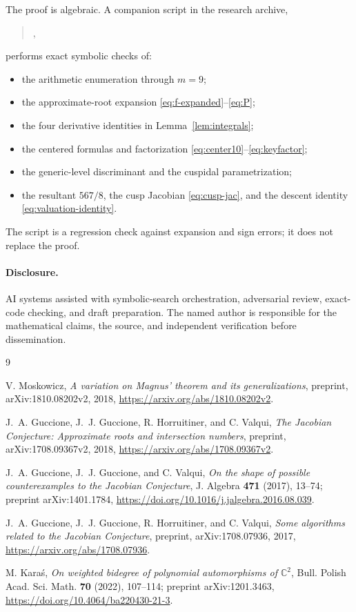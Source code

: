 \documentclass[11pt]{article}
\theoremstyle{definition}
\theoremstyle{remark}
\newcommand{\C}{\mathbb C}
\begin{document}
The proof is algebraic.  A companion script in the research archive,
\begin{quote}\scriptsize
{},
\end{quote}
performs exact symbolic checks of:
\begin{itemize}
 \item the arithmetic enumeration through \(m=9\);
 \item the approximate-root expansion
 \eqref{eq:f-expanded}--\eqref{eq:P};
 \item the four derivative identities in
 Lemma~\ref{lem:integrals};
 \item the centered formulas and factorization
 \eqref{eq:center10}--\eqref{eq:keyfactor};
 \item the generic-level discriminant and the cuspidal parametrization;
 \item the resultant \(567/8\), the cusp Jacobian
 \eqref{eq:cusp-jac}, and the descent identity
 \eqref{eq:valuation-identity}.
\end{itemize}
The script is a regression check against expansion and sign errors; it
does not replace the proof.

\paragraph{Disclosure.}
AI systems assisted with symbolic-search orchestration, adversarial
review, exact-code checking, and draft preparation.  The named author
is responsible for the mathematical claims, the source, and
independent verification before dissemination.

\begin{thebibliography}{9}

V. Moskowicz,
\emph{A variation on Magnus' theorem and its generalizations},
preprint, arXiv:1810.08202v2, 2018,
\url{https://arxiv.org/abs/1810.08202v2}.

J.~A. Guccione, J.~J. Guccione, R. Horruitiner, and C. Valqui,
\emph{The Jacobian Conjecture: Approximate roots and intersection
numbers},
preprint, arXiv:1708.09367v2, 2018,
\url{https://arxiv.org/abs/1708.09367v2}.

J.~A. Guccione, J.~J. Guccione, and C. Valqui,
\emph{On the shape of possible counterexamples to the Jacobian
Conjecture},
J. Algebra \textbf{471} (2017), 13--74;
preprint arXiv:1401.1784,
\url{https://doi.org/10.1016/j.jalgebra.2016.08.039}.

J.~A. Guccione, J.~J. Guccione, R. Horruitiner, and C. Valqui,
\emph{Some algorithms related to the Jacobian Conjecture},
preprint, arXiv:1708.07936, 2017,
\url{https://arxiv.org/abs/1708.07936}.

M. Kara\'s,
\emph{On weighted bidegree of polynomial automorphisms of
\(\C^2\)},
Bull. Polish Acad. Sci. Math. \textbf{70} (2022), 107--114;
preprint arXiv:1201.3463,
\url{https://doi.org/10.4064/ba220430-21-3}.

\end{thebibliography}
\end{document}
